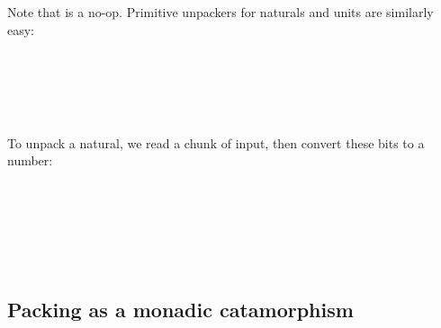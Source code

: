 \documentclass[fleqn,runningheads]{llncs}
\begin{document}
Note that  is a no-op.
Primitive unpackers for naturals and units are similarly easy:
\begin{code}%
\>[0]\AgdaSpace{}%
\AgdaSymbol{:}\AgdaSpace{}%
\AgdaSpace{}%
\<%
\\
\>[0]\AgdaSpace{}%
\AgdaSymbol{=}\AgdaSpace{}%
\<%
\\
%
\\[\AgdaEmptyExtraSkip]%
\>[0]\AgdaSpace{}%
\AgdaSymbol{:}\AgdaSpace{}%
\AgdaSpace{}%
\<%
\\
\>[0]\AgdaSpace{}%
\AgdaSymbol{=}\AgdaSpace{}%
\AgdaSpace{}%
\<%
\end{code}
To unpack a natural, we read a chunk of input, then convert these bits to a number:
\begin{code}%
\>[0]\AgdaSpace{}%
\AgdaSymbol{:}\AgdaSpace{}%
\AgdaSpace{}%
\<%
\\
\>[0]\AgdaSpace{}%
\AgdaSymbol{=}\AgdaSpace{}%
\<%
\\
\>[0][@{}l@{\AgdaIndent{0}}]%
\>[2]\AgdaSpace{}%
\AgdaSpace{}%
\<%
\\
%
\>[2]\AgdaSpace{}%
\AgdaSymbol{(}\AgdaSpace{}%
\AgdaOperator{\AgdaInductiveConstructor{,}}\AgdaSpace{}%
\AgdaSymbol{)}\AgdaSpace{}%
\AgdaSymbol{=}\AgdaSpace{}%
\AgdaSpace{}%
\AgdaSpace{}%
\<%
\\
%
\>[2]\AgdaSpace{}%
\<%
\\
%
\>[2]\AgdaSpace{}%
\AgdaSymbol{(}\AgdaSpace{}%
\AgdaSymbol{)}\<%
\end{code}

\pagebreak[4] %
\subsection{Packing as a monadic catamorphism}
\end{document}
